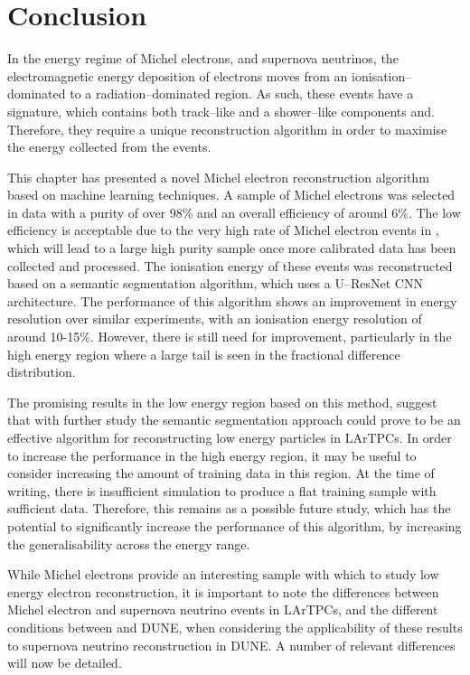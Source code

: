 \section{Conclusion} \label{ME_EU}

In the energy regime of Michel electrons, and supernova neutrinos, the
electromagnetic energy deposition of electrons moves from an 
ionisation--dominated to a radiation--dominated region. As such, these events 
have a signature, which contains both track--like and a shower--like 
components and. Therefore, they require a unique reconstruction algorithm in 
order to maximise the energy collected from the events.

This chapter has presented a novel Michel electron reconstruction algorithm 
based on machine learning techniques. A sample of Michel electrons was 
selected in \protodune{} data with a purity of over 98\% and an overall 
efficiency of around 6\%. The low efficiency is acceptable due to the very high
rate of Michel electron events in \protodune{}, which will lead to a large high
purity sample once more calibrated data has been collected and processed. The 
ionisation energy of these events was reconstructed based on a semantic 
segmentation algorithm, which uses a U--ResNet CNN architecture. The 
performance of this algorithm shows an improvement in energy resolution over 
similar experiments, with an ionisation energy resolution of around 10-15\%.  
However, there is still need for improvement, particularly in the high energy 
region where a large tail is seen in the fractional difference distribution.

The promising results in the low energy region based on this method, suggest
that with further study the semantic segmentation approach could prove to be an
effective algorithm for reconstructing low energy particles in LArTPCs. In 
order to increase the performance in the high energy region, it may be useful 
to consider increasing the amount of training data in this region. At the time 
of writing, there is insufficient \protodune{} simulation to produce a flat 
training sample with sufficient data. Therefore, this remains as a possible 
future study, which has the potential to significantly increase the 
performance of this algorithm, by increasing the generalisability across the 
energy range.

While Michel electrons provide an interesting sample with which to study low
energy electron reconstruction, it is important to note the differences between
Michel electron and supernova neutrino events in LArTPCs, and the
different conditions between \protodune{} and DUNE, when considering the
applicability of these results to supernova neutrino reconstruction in DUNE. A 
number of relevant differences will now be detailed.

